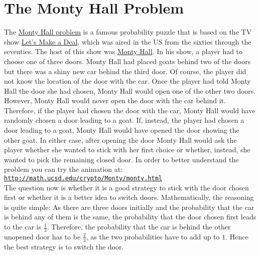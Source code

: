 \section{The Monty Hall Problem}
The \href{http://en.wikipedia.org/wiki/Monty_Hall_problem}{Monty Hall problem} is a famous probability
puzzle that is based on the TV show 
\href{http://en.wikipedia.org/wiki/Let%27s_Make_a_Deal}{Let's Make a Deal}, which was aired in the
US from the sixties through the seventies.  The host of this show was 
\href{http://en.wikipedia.org/wiki/Monty_Hall}{Monty Hall}. In his show, a player had to choose one
of three doors.  Monty Hall had placed goats behind two of the doors but there was a shiny new car
behind the third door.  Of course, the player did not know the location of the door with the car.  
Once the player had told Monty Hall the door she had chosen, Monty Hall would open one of the other
two doors.  However, Monty Hall would never open the door with the car behind it.  Therefore, if the
player had chosen the door with the car, Monty Hall would have randomly chosen a door leading to a
goat.  If, instead, the player had chosen a door leading to a goat, Monty Hall would have opened the
door showing the other goat.  In either case, after opening the door  Monty Hall would ask the
player whether she wanted to stick with her first choice or whether, instead, she wanted to pick the
remaining closed door.  In order to better understand the problem you can try the animation at:
\\[0.2cm]
\hspace*{1.3cm}
\href{http://math.ucsd.edu/~crypto/Monty/monty.html}{\texttt{http://math.ucsd.edu/crypto/Monty/monty.html}}
\\[0.2cm]
The question now is whether it is a good strategy to stick with the door chosen first or whether it
is a better idea to switch doors.  Mathematically, the reasoning is quite simple: As there are three doors
initially and the probability that the car is behind any of them is the same, the probability that the
door chosen first leads to the car is $\frac{1}{3}$.  Therefore, the probability that the car is behind
the other unopened door has to be $\frac{2}{3}$, as the two probabilities have to add up to $1$.  Hence the
best strategy is to switch the door.

